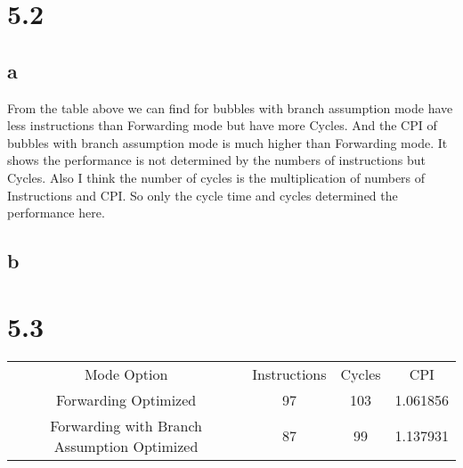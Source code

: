 \documentclass[]{article}
\begin{document}
\section*{5.2}
\subsection*{a}
From the table above we can find for bubbles with branch assumption mode have less instructions than Forwarding mode but have more Cycles. And the CPI of bubbles with branch assumption mode is much higher than Forwarding mode. It shows the performance is not determined by the numbers of instructions but Cycles. Also I think the number of cycles is the multiplication of numbers of Instructions and CPI.\newline
So only the cycle time and cycles determined the performance here.\newline
\subsection*{b}

\section*{5.3}
\begin{center}
	\begin{tabular}{ c c c c }
		Mode Option & Instructions & Cycles & CPI \\
		Forwarding Optimized& 97 & 103 & 1.061856\\
		Forwarding with Branch Assumption Optimized& 87 &  99  & 1.137931\\
	\end{tabular}
\end{center}
\end{document}
